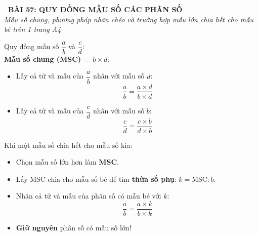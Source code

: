 \documentclass[14pt,a4paper,oneside]{extbook}
\begin{document}
\noindent
\begin{tcolorbox}[
  enhanced,
  colback=teal!8!white,
  colframe=teal!80!black,
  arc=3mm, boxrule=1pt,
  left=3mm, right=3mm, top=2mm, bottom=2mm,
  halign=center
]
  {\Large\bfseries\color{teal!90!black}\faBookmark\ BÀI 57: QUY ĐỒNG MẪU SỐ CÁC PHÂN SỐ}\\[1.5pt]
  {\footnotesize\itshape\color{black!75} Mẫu số chung, phương pháp nhân chéo và trường hợp mẫu lớn chia hết cho mẫu bé trên 1 trang A4}
\end{tcolorbox}

\vspace{-2.5mm}

\noindent
\begin{minipage}[t]{0.49\textwidth}\vspace{0pt}
\begin{tcolorbox}[
  enhanced,
  colback=blue!4!white,
  colframe=blue!75!black,
  arc=2mm, boxrule=0.8pt,
  left=2mm, right=2mm, top=1.8mm, bottom=1.8mm,
  title={\footnotesize\bfseries\color{white}\faArrowsH\ 1. Trường hợp chung (Nhân chéo)}
]
{\footnotesize
Quy đồng mẫu số $\dfrac{a}{b}$ và $\dfrac{c}{d}$:\\
\textbf{Mẫu số chung (MSC) = $b \times d$}:
\begin{itemize}\setlength{\itemsep}{1pt}\setlength{\leftskip}{-2.5mm}
  \item Lấy cả tử và mẫu của $\dfrac{a}{b}$ nhân với mẫu số $d$:
  $$\dfrac{a}{b} = \dfrac{a \times d}{b \times d}$$
  \item Lấy cả tử và mẫu của $\dfrac{c}{d}$ nhân với mẫu số $b$:
  $$\dfrac{c}{d} = \dfrac{c \times b}{d \times b}$$
\end{itemize}
}
\end{tcolorbox}
\end{minipage}
\hfill
\begin{minipage}[t]{0.49\textwidth}\vspace{0pt}
\begin{tcolorbox}[
  enhanced,
  colback=teal!4!white,
  colframe=teal!75!black,
  arc=2mm, boxrule=0.8pt,
  left=2mm, right=2mm, top=1.8mm, bottom=1.8mm,
  title={\footnotesize\bfseries\color{white}\faLightbulbO\ 2. Mẫu lớn chia hết cho mẫu bé}
]
{\footnotesize
Khi một mẫu số chia hết cho mẫu số kia:
\begin{itemize}\setlength{\itemsep}{1pt}\setlength{\leftskip}{-2.5mm}
  \item Chọn mẫu số lớn hơn làm \textbf{MSC}.
  \item Lấy MSC chia cho mẫu số bé để tìm \textbf{thừa số phụ}: $k = \text{MSC} : b$.
  \item Nhân cả tử và mẫu của phân số có mẫu bé với $k$:
  $$\dfrac{a}{b} = \dfrac{a \times k}{b \times k}$$
  \item \textbf{Giữ nguyên} phân số có mẫu số lớn!
\end{itemize}
}
\end{tcolorbox}
\end{minipage}
\end{document}
